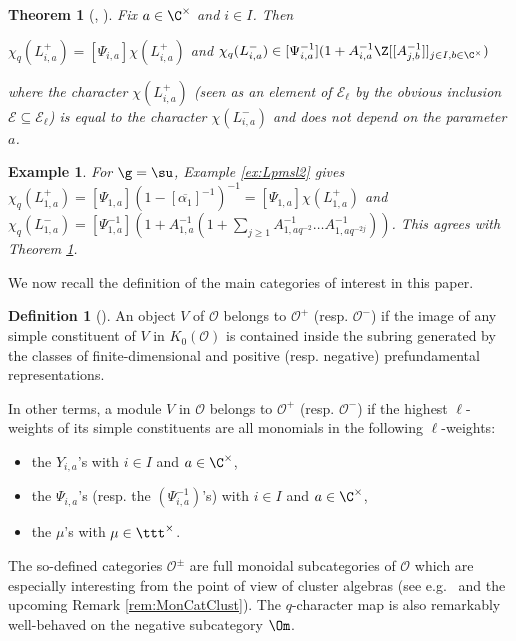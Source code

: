 \documentclass[11pt]{amsart}
\newtheorem{thm}[theorem]{Theorem}
\newtheorem{example}[theorem]{Example}
\theoremstyle{definition}
\newtheorem{defn}[theorem]{Definition}
\theoremstyle{remark}
\numberwithin{equation}{section}
\begin{document}
\begin{thm}[{\cite[Theorem 4.1]{fh1}}, {\cite[Theorem 5.3]{hl2}}]\label{prop:qcharprefond} Fix $a \in \C^{\times}$ and $i\in I$. Then 
\begin{center}
$\chi_q(L_{i,a}^+) = [\Psi_{i,a}]\chi(L_{i,a}^+)$ and $\chi_q(L_{i,a}^-) \in [\Psi_{i,a}^{-1}](1+A_{i,a}^{-1}\Z[[A_{j,b}^{-1}]]_{j\in I, b\in\C^{\times}})$
\end{center}
where the character $\chi(L_{i,a}^+)$ (seen as an element of $\mathcal{E}_{\ell}$ by the obvious inclusion $\mathcal{E}\subseteq \mathcal{E}_{\ell}$) is equal to the character $\chi(L_{i,a}^-)$ and does not depend on the parameter $a$.
\end{thm}
\begin{example}\label{ex:qcharLmsu} For $\g=\su$, Example \ref{ex:Lpmsl2} gives $\chi_q(L_{1,a}^+)=[\Psi_{1,a}](1-[\overline{\alpha_1}]^{-1})^{-1} = [\Psi_{1,a}]\chi(L_{1,a}^+)$ and $\chi_q(L_{1,a}^-) = [\Psi_{1,a}^{-1}](1+A_{1,a}^{-1}(1+\sum_{j\geq 1} A_{1,aq^{-2}}^{-1}\dots A_{1,aq^{-2j}}^{-1}))$. This agrees with Theorem \ref{prop:qcharprefond}.
\end{example}
We now recall the definition of the main categories of interest in this paper.
\begin{defn}[{\cite[Definition 3.9]{hl2}}]\label{def:Opm} An object $V$ of $\mathcal{O}$ belongs to $\mathcal{O}^+$ (resp. $\mathcal{O}^-$) if the image of any simple constituent of $V$ in %
 $K_0(\mathcal{O})$ is contained inside the subring generated by the classes of finite-dimensional %
 and positive (resp. negative)
 prefundamental representations.
\end{defn}
In other terms, a module $V$ in $\mathcal{O}$ belongs to $\mathcal{O}^+$ (resp. $\mathcal{O}^-$) if the highest $\ell$-weights of its simple constituents are all monomials in the following $\ell$-weights:
\begin{itemize}
\item[(i)] the $Y_{i,a}$'s with $i\in I$ and $a\in \C^{\times}$,
\item[(ii)] the $\Psi_{i,a}$'s (resp. the $(\Psi_{i,a}^{-1})$'s) with $i\in I$ and $a\in \C^{\times}$,
\item[(iii)] the $\mu$'s with $\mu \in \ttt^{\times}$.
\end{itemize}
The so-defined categories $\mathcal{O}^{\pm}$ are full monoidal subcategories of $\mathcal{O}$ which are especially interesting from the point of view of cluster algebras (see e.g.~\cite{hl2,bi} and the upcoming Remark \ref{rem:MonCatClust}). The $q$-character map is also remarkably well-behaved on the negative subcategory $\Om$.
\end{document}
